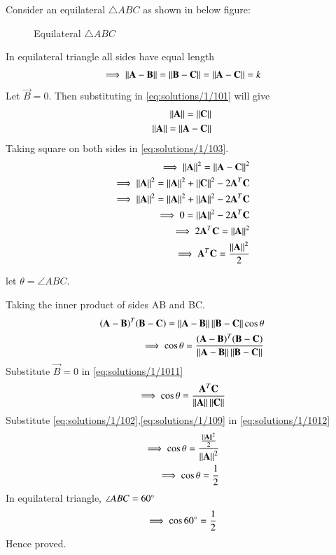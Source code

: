 Consider an equilateral $\triangle{ABC}$ as shown in below figure:
\begin{figure}[!ht]
    \label{Fig:solutions/1/10/1}
    \centering
    \resizebox{\columnwidth}{!}{}
    \caption{Equilateral $\triangle{ABC}$}
\end{figure}

In equilateral triangle all sides have equal length
\begin{align}
    \label{eq:solutions/1/101}\implies\left\lVert\mathbf{A-B}\right\rVert=\left\lVert\mathbf{B-C}\right\rVert=\left\lVert\mathbf{A-C}\right\rVert=k
\end{align}
Let $\vec{B}=0$. Then substituting in \eqref{eq:solutions/1/101} will give
\begin{align}
    \label{eq:solutions/1/102}\left\lVert\mathbf{A}\right\rVert=\left\lVert\mathbf{C}\right\rVert\\
    \label{eq:solutions/1/103}\left\lVert\mathbf{A}\right\rVert=\left\lVert\mathbf{A-C}\right\rVert
\end{align}
Taking square on both sides in \eqref{eq:solutions/1/103}.
\begin{align}
    \implies\left\lVert\mathbf{A}\right\rVert^2=\left\lVert\mathbf{A-C}\right\rVert^2\\
    \implies\left\lVert\mathbf{A}\right\rVert^2=\left\lVert\mathbf{A}\right\rVert^2+\left\lVert\mathbf{C}\right\rVert^2-2\mathbf{A}^T\mathbf{C}\\
    \implies\left\lVert\mathbf{A}\right\rVert^2=\left\lVert\mathbf{A}\right\rVert^2+\left\lVert\mathbf{A}\right\rVert^2-2\mathbf{A}^T\mathbf{C}\\
    \implies0=\left\lVert\mathbf{A}\right\rVert^2-2\mathbf{A}^T\mathbf{C}\\
    \implies2\mathbf{A}^T\mathbf{C}=\left\lVert\mathbf{A}\right\rVert^2\\
    \label{eq:solutions/1/109}\implies\mathbf{A}^T\mathbf{C}=\frac{\left\lVert\mathbf{A}\right\rVert^2}{2}
\end{align}

let $\theta=\angle ABC$.

Taking the inner product of sides AB and BC.
\begin{align}
    (\mathbf{A}-\mathbf{B})^T(\mathbf{B}-\mathbf{C}) =
    \left\lVert\mathbf{A}-\mathbf{B}\right\rVert\left\lVert\mathbf{B}-\mathbf{C}\right\rVert\cos{\theta}\\
    \label{eq:solutions/1/1011}\implies \cos{\theta}=\frac{(\mathbf{A}-\mathbf{B})^T(\mathbf{B}-\mathbf{C})}{\left\lVert\mathbf{A}-\mathbf{B}\right\rVert\left\lVert\mathbf{B}-\mathbf{C}\right\rVert}
\end{align}
Substitute $\vec{B}=0$ in \eqref{eq:solutions/1/1011}
\begin{align}
    \label{eq:solutions/1/1012}\implies\cos{\theta}=\frac{\mathbf{A}^T\mathbf{C}}{\left\lVert\mathbf{A}\right\rVert\left\lVert\mathbf{C}\right\rVert}
\end{align}
Substitute \eqref{eq:solutions/1/102},\eqref{eq:solutions/1/109} in \eqref{eq:solutions/1/1012}
\begin{align}
    \implies\cos\theta=\frac{\frac{\left\lVert\mathbf{A}\right\rVert^2}{2}}{\left\lVert\mathbf{A}\right\rVert^2}\\
    \implies\cos\theta=\frac{1}{2}
\end{align}
In equilateral triangle, $\angle ABC=60\degree$
\begin{align}
    \implies\cos60\degree=\frac{1}{2}
\end{align}
Hence proved.

